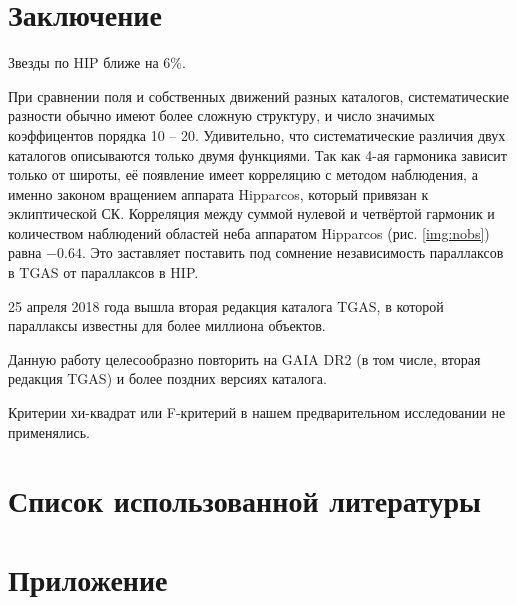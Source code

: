 \documentclass[14pt]{article} %
\begin{document}
\section{Заключение}\label{conclusion}
Звезды по HIP ближе на $6\%$.

При сравнении поля и собственных движений разных каталогов, систематические разности обычно имеют более сложную структуру, и число значимых коэффицентов порядка 10 -- 20. Удивительно, что систематические различия двух каталогов описываются только двумя функциями. Так как 4-ая гармоника зависит только от широты, её появление имеет корреляцию с методом наблюдения, а именно законом вращением аппарата Hipparcos, который привязан к эклиптической СК. Корреляция между суммой нулевой и четвёртой гармоник и количеством наблюдений областей неба аппаратом Hipparcos (рис. \ref{img:nobs}) равна $-0.64$. Это заставляет поставить под сомнение независимость параллаксов в TGAS от параллаксов в HIP.

25 апреля 2018 года вышла вторая редакция каталога TGAS, в которой параллаксы известны для более миллиона объектов.

Данную работу целесообразно повторить на GAIA DR2 (в том числе, вторая редакция TGAS) и более поздних версиях каталога.

Критерии хи-квадрат или F-критерий в нашем предварительном исследовании не применялись.

\newpage
\section{Список использованной литературы}\label{conclusionlit}
%
%
\printbibliography[type=online,title={Сайты}]
\printbibliography[type=book,title={Статьи:}]


\appendix

\section*{Приложение}
\end{document}
